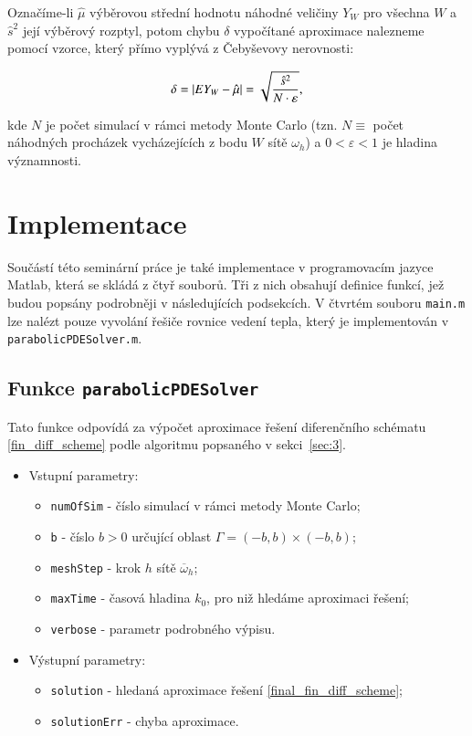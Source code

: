 \documentclass[11pt,american,czech]{article}
\newcommand*\midpoint[1]{\overline{#1}}
\begin{document}
Označíme-li $\hat{\mu}$ výběrovou střední hodnotu náhodné veličiny $Y_{W}$ pro všechna $W$ a $\hat{s}^{2}$ její výběrový rozptyl, potom chybu $\delta$ vypočítané aproximace nalezneme pomocí vzorce, který přímo vyplývá z Čebyševovy nerovnosti:

\begin{equation}
	\delta=\arrowvert EY_{W}-\hat{\mu}\arrowvert=\sqrt{\frac{\hat{s}^{2}}{N\cdot\varepsilon}},
\end{equation}

\noindent
kde $N$ je počet simulací v rámci metody Monte Carlo (tzn. $N\equiv$ počet náhodných procházek vycházejících z bodu $W$ sítě $\omega_{h}$) a $0<\varepsilon<1$ je hladina významnosti.

\section{Implementace}\label{sec:4}

Součástí této seminární práce je také implementace v programovacím jazyce Matlab, která se skládá z čtyř souborů. Tři z nich obsahují definice funkcí, jež budou popsány podrobněji v následujících podsekcích. V čtvrtém souboru \texttt{main.m} lze nalézt pouze vyvolání řešiče rovnice vedení tepla, který je implementován v \texttt{parabolicPDESolver.m}.

\subsection{Funkce \texttt{parabolicPDESolver}}\label{sec:4.1}

Tato funkce odpovídá za výpočet aproximace řešení diferenčního schématu \eqref{fin_diff_scheme} podle algoritmu popsaného v sekci~\ref{sec:3}.

\begin{itemize}
	\item Vstupní parametry:
		\begin{itemize}
			\item \texttt{numOfSim} - číslo simulací v rámci metody Monte Carlo;
			\item \texttt{b} - číslo $b>0$ určující oblast $\Gamma=(-b,b)\times(-b,b)$;
			\item \texttt{meshStep} - krok $h$ sítě $\midpoint{\omega}_{h}$;
			\item \texttt{maxTime} - časová hladina $k_{0}$, pro niž hledáme aproximaci řešení;
			\item \texttt{verbose} - parametr podrobného výpisu.
		\end{itemize}
	\item Výstupní parametry:
		\begin{itemize}
			\item \texttt{solution} - hledaná aproximace řešení \eqref{final_fin_diff_scheme};
			\item \texttt{solutionErr} - chyba aproximace.
		\end{itemize}
\end{itemize}
\end{document}
